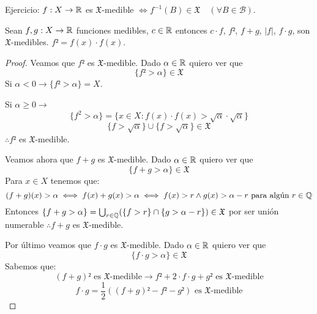 Ejercicio: $f: X \to \mathbb{R}$ es $\mathfrak{X}$-medible $\iff f^{-1}(B) \in \mathfrak{X} \quad (\forall B \in \mathcal{B})$.

\clearpage

\begin{lemma}
    Sean $f, g: X \to \mathbb{R}$ funciones medibles, $c \in \mathbb{R}$ entonces $c \cdot f$, $f²$, $f + g$, $|f|$, $f \cdot g$, son $\mathfrak{X}$-medibles.
    $f² = f(x) \cdot f(x)$.
    \begin{proof}
        Veamos que $f²$ es $\mathfrak{X}$-medible. Dado $\alpha \in \mathbb{R}$ quiero ver que \begin{equation}
            \{ f² > \alpha \} \in \mathfrak{X}
        \end{equation}
        Si $\alpha < 0 \to \{ f² > \alpha \} = X$.

        Si $\alpha \geq 0 \to$
        \begin{equation}
            \{ f^2 > \alpha \} = \{ x \in X : f(x) \cdot f(x) > \sqrt{\alpha} \cdot \sqrt{\alpha} \}
        \end{equation}
        \begin{equation}
            \{ f > \sqrt{\alpha} \} \cup \{ f > \sqrt{\alpha} \} \in \mathfrak{X}
        \end{equation} $\therefore f²$ es $\mathfrak{X}$-medible.

        Veamos ahora que $f + g$ es $\mathfrak{X}$-medible. Dado $\alpha \in \mathbb{R}$ quiero ver que \begin{equation}
            \{ f + g > \alpha \} \in \mathfrak{X}
        \end{equation}
        Para $x \in X$ tenemos que: \begin{equation}
            (f+g)(x) > \alpha \iff f(x) + g(x) > \alpha \iff f(x) > r \land g(x) > \alpha - r \text{ para algún } r \in \mathbb{Q}
        \end{equation}
        Entonces $\{ f + g > \alpha \} = \bigcup_{r \in \mathbb{Q}} (\{ f > r \} \cap \{ g > \alpha - r \}) \in \mathfrak{X}$ por ser unión numerable $\therefore f+g$ es $\mathfrak{X}$-medible.

        Por último veamos que $f \cdot g$ es $\mathfrak{X}$-medible. Dado $\alpha \in \mathbb{R}$ quiero ver que \begin{equation}
            \{ f \cdot g > \alpha \} \in \mathfrak{X}
        \end{equation}
        Sabemos que:
        \begin{equation}
            (f+g)² \text{ es } \mathfrak{X} \text{-medible} \to f² + 2 \cdot f \cdot g + g² \text{ es } \mathfrak{X} \text{-medible}
        \end{equation}
        \begin{equation}
            f \cdot g = \frac{1}{2} \left( (f+g)² - f² - g² \right) \text{ es } \mathfrak{X} \text{-medible}
        \end{equation}
    \end{proof}
\end{lemma}

